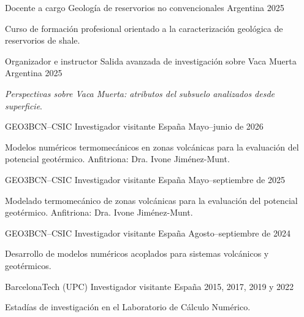 
\begin{cventries}

\cventry
    {Docente a cargo}
    {Geología de reservorios no convencionales}
    {Argentina}
    {2025}
    {
      \begin{cvitems}
        \item {Curso de formación profesional orientado a la caracterización geológica de reservorios de shale.}
      \end{cvitems}
    }

\cventry
    {Organizador e instructor}
    {Salida avanzada de investigación sobre Vaca Muerta}
    {Argentina}
    {2025}
    {
      \begin{cvitems}
        \item {\emph{Perspectivas sobre Vaca Muerta: atributos del subsuelo analizados desde superficie}.}
      \end{cvitems}
    }

\end{cventries}


\begin{cventries}

\cventry
    {GEO3BCN--CSIC}
    {Investigador visitante}
    {España}
    {Mayo--junio de 2026}
    {
      \begin{cvitems}
        \item {Modelos numéricos termomecánicos en zonas volcánicas para la evaluación del potencial geotérmico. Anfitriona: Dra. Ivone Jiménez-Munt.}
      \end{cvitems}
    }

\cventry
    {GEO3BCN--CSIC}
    {Investigador visitante}
    {España}
    {Mayo--septiembre de 2025}
    {
      \begin{cvitems}
        \item {Modelado termomecánico de zonas volcánicas para la evaluación del potencial geotérmico. Anfitriona: Dra. Ivone Jiménez-Munt.}
      \end{cvitems}
    }

\cventry
    {GEO3BCN--CSIC}
    {Investigador visitante}
    {España}
    {Agosto--septiembre de 2024}
    {
      \begin{cvitems}
        \item {Desarrollo de modelos numéricos acoplados para sistemas volcánicos y geotérmicos.}
      \end{cvitems}
    }

\cventry
    {BarcelonaTech (UPC)}
    {Investigador visitante}
    {España}
    {2015, 2017, 2019 y 2022}
    {
      \begin{cvitems}
        \item {Estadías de investigación en el Laboratorio de Cálculo Numérico.}
      \end{cvitems}
    }

\end{cventries}
